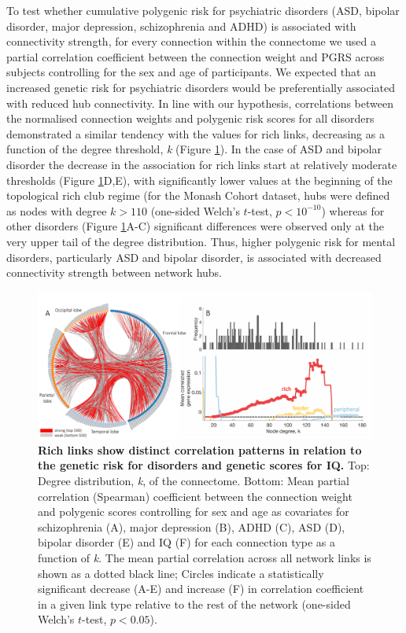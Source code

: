 To test whether cumulative polygenic risk for psychiatric disorders (ASD, bipolar disorder, major depression, schizophrenia and ADHD) is associated with  connectivity strength, for every connection within the connectome we used a partial correlation coefficient between the connection weight and PGRS across subjects controlling for the sex and age of participants. We expected that an increased genetic risk for psychiatric disorders would be preferentially associated with reduced hub connectivity. In line with our hypothesis,  correlations between the normalised connection weights and polygenic risk scores for all disorders demonstrated a similar tendency with the values for rich links, decreasing as a function of the degree threshold, \textit{k} (Figure \ref{fig:Ch5Fig5}). In the case of ASD and bipolar disorder the decrease in the association for rich links start at relatively moderate thresholds (Figure \ref{fig:Ch5Fig5}D,E), with significantly lower values at the beginning of the topological rich club regime (for the Monash Cohort dataset, hubs were defined as nodes with degree $k>110$ (one-sided Welch's $t$-test, $p < 10^{-10}$) whereas for other disorders (Figure \ref{fig:Ch5Fig5}A-C) significant differences were observed only at the very upper tail of the degree distribution. Thus, higher polygenic risk for mental disorders, particularly ASD and bipolar disorder, is associated with decreased connectivity strength between network hubs.

\begin{figure}[h!]
\begin{center}
\includegraphics[width=1\textwidth]{Chapter5/Ch5Fig5.pdf}%
\end{center}
\caption{\textbf{Rich links show distinct correlation patterns in relation to the genetic risk for disorders and genetic scores for IQ.}
Top: Degree distribution, \textit{k}, of the connectome. Bottom: Mean partial correlation (Spearman) coefficient between the connection weight and polygenic scores controlling for sex and age as covariates for schizophrenia (A), major depression (B), ADHD (C), ASD (D), bipolar disorder (E) and IQ (F) for each connection type as a function of \textit{k}. The mean partial correlation across all network links is shown as a dotted black line; Circles indicate a statistically significant decrease (A-E) and increase (F) in correlation coefficient in a given link type relative to the rest of the network (one-sided Welch's $t$-test, $p < 0.05$).}
\label{fig:Ch5Fig5}
\end{figure}

